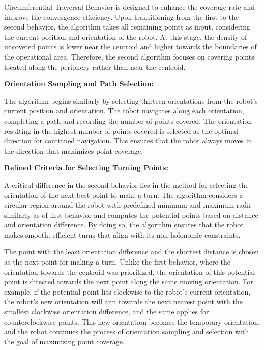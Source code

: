 \vspace*{6mm}   

Circumferential-Traversal Behavior is designed to enhance the coverage rate and improve the convergence efficiency. Upon transitioning from the first to the second behavior, the algorithm takes all remaining points as input, considering the current position and orientation of the robot. At this stage, the density of uncovered points is lower near the centroid and higher towards the boundaries of the operational area. Therefore, the second algorithm focuses on covering points located along the periphery rather than near the centroid.

\vspace*{6mm}   

\textbf{Orientation Sampling and Path Selection:}

The algorithm begins similarly by selecting thirteen orientations from the robot's current position and orientation. The robot navigates along each orientation, completing a path and recording the number of points covered. The orientation resulting in the highest number of points covered is selected as the optimal direction for continued navigation. This ensures that the robot always moves in the direction that maximizes point coverage.

\vspace*{6mm}   

\textbf{Refined Criteria for Selecting Turning Points:}

A critical difference in the second behavior lies in the method for selecting the orientation of the next best point to make a turn. The algorithm considers a circular region around the robot with predefined minimum and maximum radii similarly as of first behavior and computes the potential points based on distance and orientation difference. By doing so, the algorithm ensures that the robot makes smooth, efficient turns that align with its non-holonomic constraints.

\vspace*{6mm}   

The point with the least orientation difference and the shortest distance is chosen as the next point for making a turn. Unlike the first behavior, where the orientation towards the centroid was prioritized, the orientation of this potential point is directed towards the next point along the same moving orientation. For example, if the potential point lies clockwise to the robot's current orientation, the robot's new orientation will aim towards the next nearest point with the smallest clockwise orientation difference, and the same applies for counterclockwise points. This new orientation becomes the temporary orientation, and the robot continues the process of orientation sampling and selection with the goal of maximizing point coverage.

